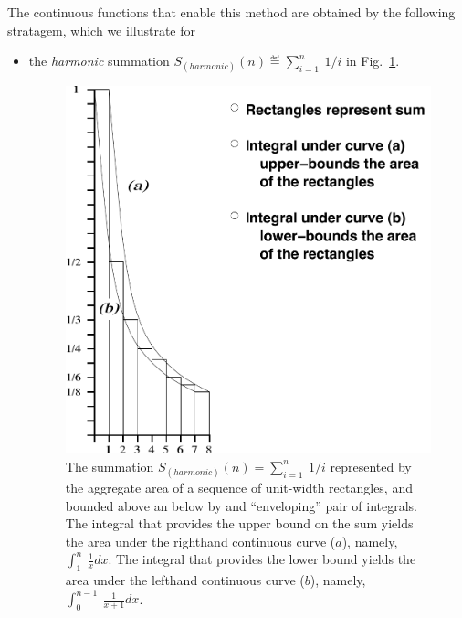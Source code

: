\documentclass{article}
\begin{document}
The continuous functions that enable this method are obtained by the
following stratagem, which we illustrate for
\begin{itemize}
\item
the {\it harmonic} summation $S_{(harmonic)}(n) \eqdef \sum_{i=1}^n
  \ 1/i$ in Fig.~\ref{fig:riemann-harmonic}.
\begin{figure}[htb]
\centerline{
\includegraphics[scale=0.42]{riemann2.pdf}
}
\caption{The summation $S_{(harmonic)}(n) = \sum_{i=1}^n \ 1/i$
  represented by the aggregate area of a sequence of unit-width
  rectangles, and bounded above an below by and ``enveloping'' pair of
  integrals.  The integral that provides the upper bound on the sum
  yields the area under the righthand continuous curve ($a$), namely,
  $\displaystyle \int_1^n \ \frac{1}{x} dx$.  The integral that
  provides the lower bound yields the area under the lefthand
  continuous curve ($b$), namely, $\displaystyle \int_0^{n-1}
  \ \frac{1}{x+1} dx$.}
\label{fig:riemann-harmonic}
\end{figure}


\end{itemize}
\end{document}
